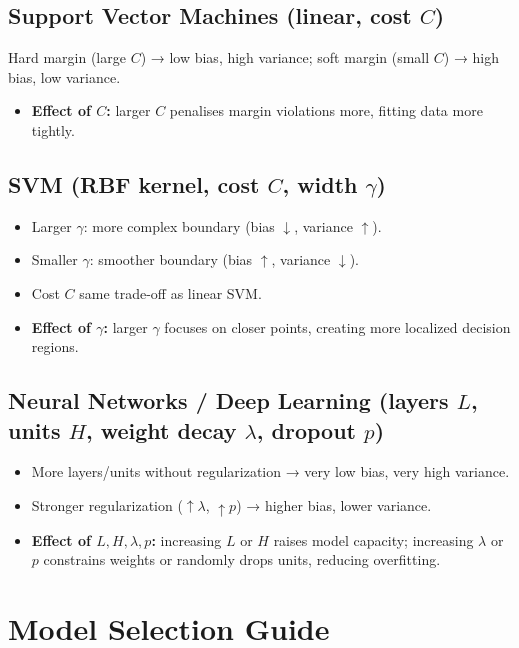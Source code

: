 \documentclass{article}
\begin{document}
\subsection{Support Vector Machines (linear, cost \(C\))}
Hard margin (large \(C\)) → low bias, high variance; soft margin (small \(C\)) → high bias, low variance.
\begin{itemize}
  \item \textbf{Effect of \(C\):} larger \(C\) penalises margin violations more, fitting data more tightly.
\end{itemize}

\subsection{SVM (RBF kernel, cost \(C\), width \(\gamma\))}
\begin{itemize}
  \item Larger \(\gamma\): more complex boundary (bias \(\downarrow\), variance \(\uparrow\)).
  \item Smaller \(\gamma\): smoother boundary (bias \(\uparrow\), variance \(\downarrow\)).
  \item Cost \(C\) same trade-off as linear SVM.
  \item \textbf{Effect of \(\gamma\):} larger \(\gamma\) focuses on closer points, creating more localized decision regions.
\end{itemize}

\subsection{Neural Networks / Deep Learning (layers \(L\), units \(H\), weight decay \(\lambda\), dropout \(p\))}
\begin{itemize}
  \item More layers/units without regularization → very low bias, very high variance.
  \item Stronger regularization (\(\uparrow\lambda\), \(\uparrow p\)) → higher bias, lower variance.
  \item \textbf{Effect of \(L, H, \lambda, p\):} increasing \(L\) or \(H\) raises model capacity; increasing \(\lambda\) or \(p\) constrains weights or randomly drops units, reducing overfitting.
\end{itemize}


\pagebreak

\section{Model Selection Guide}
\end{document}
